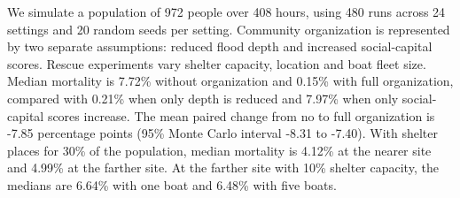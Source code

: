 We simulate a population of 972 people over 408 hours, using 480 runs across 24 settings and 20 random seeds per setting. Community organization is represented by two separate assumptions: reduced flood depth and increased social-capital scores. Rescue experiments vary shelter capacity, location and boat fleet size. Median mortality is 7.72\% without organization and 0.15\% with full organization, compared with 0.21\% when only depth is reduced and 7.97\% when only social-capital scores increase. The mean paired change from no to full organization is -7.85 percentage points (95\% Monte Carlo interval -8.31 to -7.40). With shelter places for 30\% of the population, median mortality is 4.12\% at the nearer site and 4.99\% at the farther site. At the farther site with 10\% shelter capacity, the medians are 6.64\% with one boat and 6.48\% with five boats.
